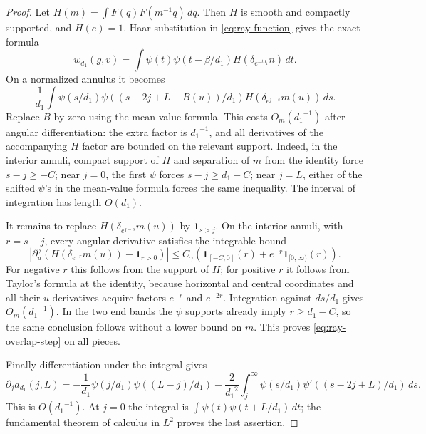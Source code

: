 \begin{proof}
Let \(H(m)=\int F(q)F(m^{-1}q)\,dq\).  Then \(H\) is smooth and
compactly supported, and \(H(e)=1\).  Haar substitution in
\eqref{eq:ray-function} gives the exact formula
\begin{equation}\label{eq:ray-overlap-exact}
 w_{d_1}(g,v)=\int\psi(t)\psi(t-\beta/{d_1})
                         H(\delta_{e^{-t d_1}}n)\,dt.
\end{equation}
On a normalized annulus it becomes
\[
 \frac1{d_1}\int\psi(s/{d_1})\psi((s-2j+L-B(u))/{d_1})
                         H(\delta_{e^{j-s}}m(u))\,ds.
\]
Replace \(B\) by zero using the mean-value formula.  This costs
\(O_m({d_1}^{-1})\) after angular differentiation: the extra factor
is \({d_1}^{-1}\), and all derivatives of the accompanying \(H\)
factor are bounded on the relevant support.  Indeed, in the interior
annuli, compact support of \(H\) and separation of \(m\) from the
identity force \(s-j\ge-C\); near \(j=0\), the first \(\psi\)
forces \(s-j\ge {d_1}-C\); near \(j=L\), either of the shifted
\(\psi\)'s in the mean-value formula forces the same inequality.
The interval of integration has length \(O({d_1})\).

It remains to replace \(H(\delta_{e^{j-s}}m(u))\) by
\(\mathbf1_{s>j}\).  On the interior annuli, with \(r=s-j\),
every angular derivative satisfies the integrable bound
\[
 \left|\partial_u^\gamma
 \left(H(\delta_{e^{-r}}m(u))-\mathbf1_{r>0}\right)\right|
 \le C_\gamma\left(
       \mathbf1_{[-C,0]}(r)+e^{-r}\mathbf1_{[0,\infty)}(r)\right).
\]
For negative \(r\) this follows from the support of \(H\); for
positive \(r\) it follows from Taylor's formula at the identity,
because horizontal and central coordinates and all their
\(u\)-derivatives acquire factors \(e^{-r}\) and \(e^{-2r}\).
Integration against \(ds/{d_1}\) gives \(O_m({d_1}^{-1})\).  In the two
end bands the \(\psi\) supports already imply \(r\ge {d_1}-C\), so
the same conclusion follows without a lower bound on \(m\).
This proves \eqref{eq:ray-overlap-step} on all pieces.

Finally differentiation under the integral gives
\[
 \partial_ja_{d_1}(j,L)=-\frac1{d_1}\psi(j/{d_1})\psi((L-j)/{d_1})
 -\frac2{{d_1}^2}\int_j^\infty\psi(s/{d_1})
                              \psi'((s-2j+L)/{d_1})\,ds.
\]
This is \(O({d_1}^{-1})\).  At \(j=0\) the integral is
\(\int\psi(t)\psi(t+L/{d_1})\,dt\); the fundamental theorem of
calculus in \(L^2\) proves the last assertion.
\end{proof}

